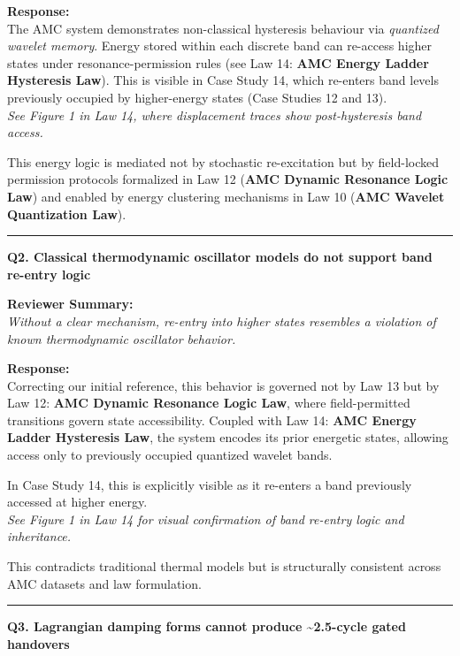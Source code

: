 \documentclass[10pt,aps,pre,onecolumn,superscriptaddress,notitlepage]{revtex4-2}
\begin{document}
\textbf{Response:} \\
The AMC system demonstrates non-classical hysteresis behaviour via \textit{quantized wavelet memory}. Energy stored within each discrete band can re-access higher states under resonance-permission rules (see Law 14: \textbf{AMC Energy Ladder Hysteresis Law}). This is visible in Case Study 14, which re-enters band levels previously occupied by higher-energy states (Case Studies 12 and 13). \\
\textit{See Figure 1 in Law 14, where displacement traces show post-hysteresis band access.}

This energy logic is mediated not by stochastic re-excitation but by field-locked permission protocols formalized in Law 12 (\textbf{AMC Dynamic Resonance Logic Law}) and enabled by energy clustering mechanisms in Law 10 (\textbf{AMC Wavelet Quantization Law}).

\vspace{1em}
\hrule
\vspace{1em}

\textbf{Q2. Classical thermodynamic oscillator models do not support band re-entry logic}

\textbf{Reviewer Summary:} \\
\textit{Without a clear mechanism, re-entry into higher states resembles a violation of known thermodynamic oscillator behavior.}

\textbf{Response:} \\
Correcting our initial reference, this behavior is governed not by Law 13 but by Law 12: \textbf{AMC Dynamic Resonance Logic Law}, where field-permitted transitions govern state accessibility. Coupled with Law 14: \textbf{AMC Energy Ladder Hysteresis Law}, the system encodes its prior energetic states, allowing access only to previously occupied quantized wavelet bands.

In Case Study 14, this is explicitly visible as it re-enters a band previously accessed at higher energy. \\
\textit{See Figure 1 in Law 14 for visual confirmation of band re-entry logic and inheritance.}

This contradicts traditional thermal models but is structurally consistent across AMC datasets and law formulation.

\vspace{1em}
\hrule
\vspace{1em}

\textbf{Q3. Lagrangian damping forms cannot produce \textasciitilde2.5-cycle gated handovers}
\end{document}
